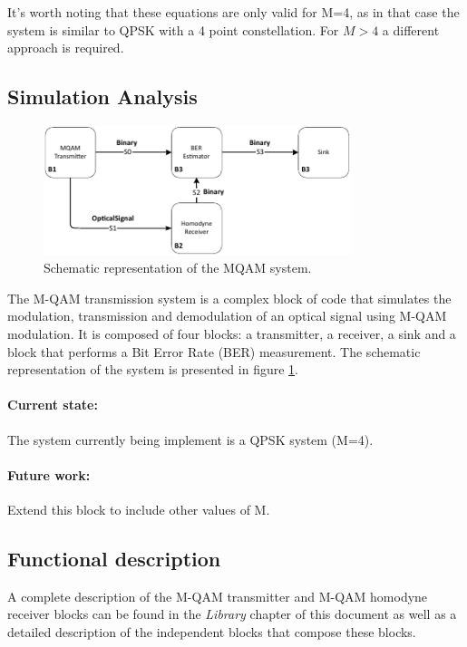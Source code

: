 It's worth noting that these equations are only valid for M=4, as in that case the system is similar to QPSK with a 4 point constellation. For $M > 4$ a different approach is required.


\subsection{Simulation Analysis}

\begin{figure}[h]
	\centering
	\includegraphics[width=0.8\textwidth]{./sdf/m_qam_system/figures/simulation_mqam}
	\caption{Schematic representation of the MQAM system.}\label{MQAM_system_block_diagram}
\end{figure}

The M-QAM transmission system is a complex block of code that simulates the modulation, transmission and
demodulation of an optical signal using M-QAM modulation.
It is composed of four blocks: a transmitter, a receiver, a sink and a block that performs a Bit Error Rate (BER) measurement. The schematic representation of the
system is presented in figure \ref{MQAM_system_block_diagram}.
	
\paragraph{Current state:} The system currently being implement is a QPSK system (M=4).

\paragraph{Future work:} Extend this block to include other values of M.

\subsection*{Functional description}

A complete description of the M-QAM transmitter and M-QAM homodyne receiver blocks can be found in the \textit{Library} chapter of this document as well as a detailed description of the independent blocks that compose these blocks.

